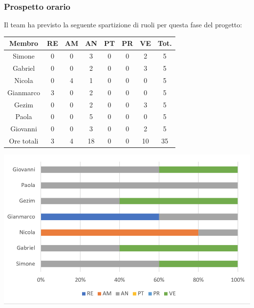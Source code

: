 \subsubsection{Prospetto orario}
Il team ha previsto la seguente spartizione di ruoli per questa fase del progetto:
\\
\begin{center}
\begin{tabular}{ |c|c|c|c|c|c|c|c|  }
 \hline
 Membro 		& RE 	& AM 	& AN 	& PT 	& PR 	& VE 	& Tot.\\
 \hline\hline
 Simone			& 0 		& 0		& 3 	& 0 		& 0 		& 2 		& 5\\
 Gabriel		& 0 		& 0 		& 2 	& 0 		& 0 		& 3 		& 5\\
 Nicola			& 0 		& 4 		& 1 	& 0 		& 0 		& 0 		& 5\\
 Gianmarco		& 3 		& 0 		& 2 	& 0 		& 0 		& 0 		& 5\\
 Gezim			& 0 		& 0 		& 2 	& 0 		& 0 		& 3	 	& 5\\
 Paola			& 0 		& 0 		& 5 	& 0 		& 0 		& 0 		& 5\\
 Giovanni		& 0 		& 0	 	& 3 	& 0 		& 0 		& 2  	& 5\\
 \hline\hline
 Ore totali		& 3		& 4		& 18 	& 0	 	& 0 		& 10 		& 35\\
  \hline
\end{tabular}
\end{center}

\includegraphics[width=\textwidth]{res/img/hi2}
\newpage
